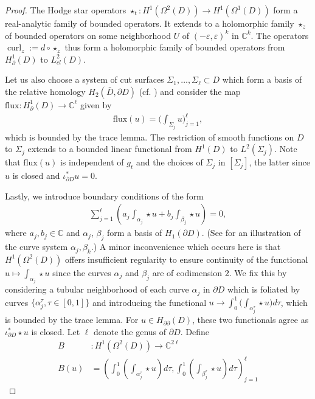 \documentclass[11pt,reqno]{amsart}
\DeclareMathOperator{\curl}{curl}
\newcommand{\hodge}{\!\star\!}
\begin{document}
\begin{proof}
    The Hodge star operators $\star_t: H^1(\Omega^2(D)) \to H^1(\Omega^1(D))$ form a real-analytic family of bounded operators. It extends to a holomorphic family $\star_z$ of bounded operators on some neighborhood $U$ of $(-\varepsilon,\varepsilon)^k$ in $\mathbb C^k$. The operators $\curl_z := d \circ \star_z$ thus form a holomorphic family of bounded operators from $H^1_{\partial}(D)$ to $L^2_{cl}(D)$.
    
    Let us also choose a system of cut surfaces $\Sigma_1,\ldots,\Sigma_\ell \subset D$ which form a basis of the relative homology $H_2(\bar D, \partial D)$ (cf. ) and consider the map $\mathrm{flux}: H^1_\partial(D) \to \mathbb C^\ell$ given by
    \begin{align*}
        \mathrm{flux}(u) = \bigg(\int_{\Sigma_j} \! u\bigg)_{j=1}^\ell,
    \end{align*}
    which is bounded by the trace lemma. The restriction of smooth functions on $D$ to $\Sigma_j$ extends to a bounded linear functional from $H^1(D)$ to $L^{2}(\Sigma_j)$. Note that $\mathrm{flux}(u)$ is independent of $g_t$ and the choices of $\Sigma_j$ in $[\Sigma_j]$, the latter since $u$ is closed and $\iota_{\partial D}^\ast u = 0$. 

    Lastly, we introduce boundary conditions of the form
    \begin{align*}
        \sum_{j=1}^\ell \left(a_j \int_{\alpha_j} \! \star u + b_j \int_{\beta_j} \! \star u\right) = 0,
    \end{align*}
    where $a_j,b_j \in \mathbb C$ and $\alpha_j$, $\beta_j$ form a basis of $H_1(\partial D)$. (See  for an illustration of the curve system $\alpha_j,\beta_k$.) A minor inconvenience which occurs here is that $H^1(\Omega^2(D))$ offers insufficient regularity to ensure continuity of the functional $u \mapsto \int_{\alpha_j} \star u$ since the curves $\alpha_j$ and $\beta_j$ are of codimension $2$. We fix this by considering a tubular neighborhood of each curve $\alpha_j$ in $\partial D$ which is foliated by curves $\{ \alpha_j^\tau, \tau \in [0,1]\}$ and introducing the functional $u \to \int_0^1\big(\int_{\alpha_j^\tau} \star u\big) d\tau$, which is bounded by the trace lemma. For $u \in H_{\partial\partial}(D)$, these two functionals agree as $\iota_{\partial D}^\ast \hodge u$ is closed. Let $\ell$ denote the genus of $\partial D$. Define
    \begin{align*}
        B&: H^1(\Omega^2(D)) \to \mathbb C^{2\ell} \\
        B(u) &= \left( \int_0^1\!\left(\int_{\alpha_j^\tau} \star u\right) d\tau , \int_0^1\!\left(\int_{\beta_j^\tau} \star u\right) d\tau \right)_{j=1}^{\ell}
    \end{align*}


\end{proof}
\end{document}
